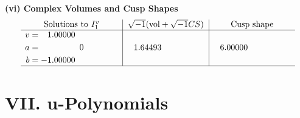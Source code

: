 \documentclass[1p]{elsarticle_modified}
\theoremstyle{definition}
\newcommand{\I}{\sqrt{-1}}
\begin{document}
\newpage\flushleft \textbf{(vi) Complex Volumes and Cusp Shapes}
$$\begin{array}{c|c|c}  
\text{Solutions to }I^v_{1}& \I (\text{vol} + \sqrt{-1}CS) & \text{Cusp shape}\\
 \hline 
\begin{aligned}
v &= \phantom{-}1.00000\phantom{ +0.000000I} \\
a &= \phantom{-0.000000 } 0 \\
b &= -1.00000\phantom{ +0.000000I}\end{aligned}
 & \phantom{-}1.64493\phantom{ +0.000000I} & \phantom{-}6.00000\phantom{ +0.000000I}\\
 \hline 
 \end{array}$$\newpage
\newpage\renewcommand{\arraystretch}{1}
\centering \section*{ VII. u-Polynomials}
\end{document}
